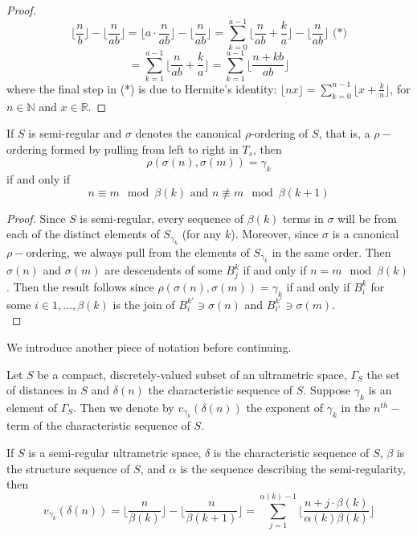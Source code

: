 \begin{proof}
\[\lfloor\frac{n}{b} \rfloor - \lfloor \frac{n}{ab} \rfloor = \lfloor a \cdot \frac{n}{ab} \rfloor - \lfloor \frac{n}{ab} \rfloor  = \sum_{k=0}^{a-1} \lfloor \frac{n}{ab} + \frac{k}{a} \rfloor - \lfloor \frac{n}{ab} \rfloor \text{ (*)}\]
\[= \sum_{k=1}^{a-1} \lfloor \frac{n}{ab} + \frac{k}{a} \rfloor = \sum_{k=1}^{a-1} \lfloor \frac{n + kb}{ab} \rfloor \]
where the final step in (*) is due to Hermite's identity: $\lfloor nx \rfloor = \sum_{k=0}^{n-1} \lfloor x + \frac{k}{n} \rfloor$, for $n \in \mathbb{N}$ and $x \in \mathbb{R}$.
\end{proof}                                                                                                              

\begin{lemma}
If $S$ is semi-regular and $\sigma$ denotes the canonical $\rho$-ordering of $S$, that is, a $\rho-$ordering formed by pulling from left to right in $T_s$, then \[\rho(\sigma(n),\sigma(m))=\gamma_k\] if and only if \[ n \equiv m \mod \beta(k) \text{  and } n \not\equiv m \mod \beta(k+1)\]
\end{lemma}

\begin{proof}
Since $S$ is semi-regular, every sequence of $\beta(k)$ terms in $\sigma$ will be from each of the distinct elements of $S_{\gamma_k}$ (for any $k$). Moreover, since $\sigma$ is a canonical $\rho-$ordering, we always pull from the elements of $S_{\gamma_k}$ in the same order. Then $\sigma(n)$ and $\sigma(m)$ are descendents of some $B^k_j$ if and only if $n = m \mod \beta(k)$. Then the result follows since $\rho(\sigma(n),\sigma(m))=\gamma_k$ if and only if $B^k_i$ for some $i \in 1,\ldots, \beta(k)$ is the join of $B^{k'}_i \ni \sigma(n)$ and $B^{k'}_{i'} \ni \sigma(m)$.  \\ 
\end{proof}

We introduce another piece of notation before continuing.

\begin{notation}
	Let $S$ be a compact, discretely-valued subset of an ultrametric space, $\Gamma_S$ the set of distances in $S$ and $\delta(n)$ the characteristic sequence of $S$. Suppose $\gamma_k$ is an element of $\Gamma_S$. Then we denote by $v_{\gamma_k}(\delta(n))$ the exponent of $\gamma_k$ in the $n^{th}-$term of the characteristic sequence of $S$.
\end{notation}

\begin{proposition}
If $S$ is a semi-regular ultrametric space, $\delta$ is the characteristic sequence of $S$, $\beta$ is the structure sequence of $S$, and $\alpha$ is the sequence describing the semi-regularity, then
\[v_{\gamma_k}(\delta(n)) =  \lfloor\frac{n}{\beta(k)}\rfloor - \lfloor\frac{n}{\beta(k+1)}\rfloor = \sum_{j=1}^{\alpha(k)-1} \lfloor \frac{n + j\cdot \beta(k)}{\alpha(k)\beta(k)} \rfloor\]
\end{proposition}

